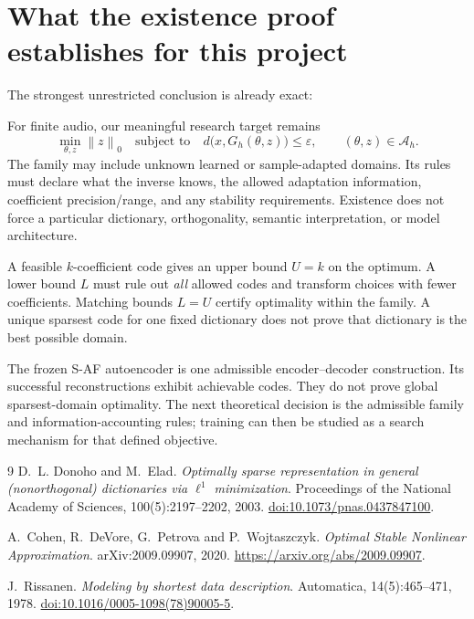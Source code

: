 \documentclass[11pt,a4paper]{article}
\theoremstyle{definition}
\theoremstyle{remark}
\newcommand{\norm}[1]{\left\lVert#1\right\rVert}
\begin{document}
\section{What the existence proof establishes for this project}

The strongest unrestricted conclusion is already exact:
\begin{center}
\end{center}

For finite audio, our meaningful research target remains
\[
\min_{\theta,z}\norm{z}_0
\quad\text{subject to}\quad
d\bigl(x,G_h(\theta,z)\bigr)\leq\varepsilon,\qquad
(\theta,z)\in\mathcal A_h.
\]
The family may include unknown learned or sample-adapted domains. Its rules must
declare what the inverse knows, the allowed adaptation information, coefficient
precision/range, and any stability requirements. Existence does not force a
particular dictionary, orthogonality, semantic interpretation, or model architecture.

A feasible $k$-coefficient code gives an upper bound $U=k$ on the optimum.
A lower bound $L$ must rule out \emph{all} allowed codes and transform choices
with fewer coefficients. Matching bounds $L=U$ certify optimality within the
family. A unique sparsest code for one fixed dictionary does not prove that
dictionary is the best possible domain.

The frozen S-AF autoencoder is one admissible encoder--decoder construction.
Its successful reconstructions exhibit achievable codes. They do not prove
global sparsest-domain optimality. The next theoretical decision is the
admissible family and information-accounting rules; training can then be studied
as a search mechanism for that defined objective.

\begin{thebibliography}{9}
D.~L. Donoho and M.~Elad.
\emph{Optimally sparse representation in general (nonorthogonal) dictionaries
via $\ell^1$ minimization}.
Proceedings of the National Academy of Sciences, 100(5):2197--2202, 2003.
\href{https://doi.org/10.1073/pnas.0437847100}{doi:10.1073/pnas.0437847100}.

A.~Cohen, R.~DeVore, G.~Petrova and P.~Wojtaszczyk.
\emph{Optimal Stable Nonlinear Approximation}.
arXiv:2009.09907, 2020.
\url{https://arxiv.org/abs/2009.09907}.

J.~Rissanen.
\emph{Modeling by shortest data description}.
Automatica, 14(5):465--471, 1978.
\href{https://doi.org/10.1016/0005-1098(78)90005-5}{doi:10.1016/0005-1098(78)90005-5}.
\end{thebibliography}
\end{document}

